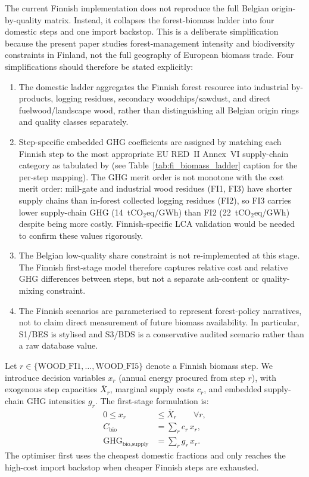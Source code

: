\documentclass{article}
\begin{document}
The current Finnish implementation does not reproduce the full Belgian origin-by-quality matrix. Instead, it collapses the forest-biomass ladder into four domestic steps and one import backstop. This is a deliberate simplification because the present paper studies forest-management intensity and biodiversity constraints in Finland, not the full geography of European biomass trade. Four simplifications should therefore be stated explicitly:
\begin{enumerate}
  \item The domestic ladder aggregates the Finnish forest resource into industrial by-products, logging residues, secondary woodchips/sawdust, and direct fuelwood/landscape wood, rather than distinguishing all Belgian origin rings and quality classes separately.
   \item Step-specific embedded GHG coefficients are assigned by matching each Finnish step to the most appropriate EU RED~II Annex~VI supply-chain category as tabulated by \citet{collaOptimalUseLignocellulosic2022} (see Table~\ref{tab:fi_biomass_ladder} caption for the per-step mapping). The GHG merit order is not monotone with the cost merit order: mill-gate and industrial wood residues (FI1, FI3) have shorter supply chains than in-forest collected logging residues (FI2), so FI3 carries lower supply-chain GHG (14~tCO$_2$eq/GWh) than FI2 (22~tCO$_2$eq/GWh) despite being more costly. Finnish-specific LCA validation would be needed to confirm these values rigorously.
 
  \item The Belgian low-quality share constraint is not re-implemented at this stage. The Finnish first-stage model therefore captures relative cost and relative GHG differences between steps, but not a separate ash-content or quality-mixing constraint.
  \item The Finnish scenarios are parameterised to represent forest-policy narratives, not to claim direct measurement of future biomass availability. In particular, S1/BES is stylised and S3/BDS is a conservative audited scenario rather than a raw database value.
\end{enumerate}

Let $r \in \{\text{WOOD\_FI1},\dots,\text{WOOD\_FI5}\}$ denote a Finnish biomass step. We introduce decision variables $x_r$ (annual energy procured from step $r$), with exogenous step capacities $\overline{X}_r$, marginal supply costs $c_r$, and embedded supply-chain GHG intensities $g_r$. The first-stage formulation is:
\begin{align}
0 \leq x_r &\leq \overline{X}_r \qquad \forall r,
\label{eq:bio_segment_cap}\\
C_{\text{bio}} &= \sum_r c_r\,x_r,
\label{eq:bio_cost}\\
\text{GHG}_{\text{bio,supply}} &= \sum_r g_r\,x_r.
\label{eq:bio_ghg}
\end{align}
The optimiser first uses the cheapest domestic fractions and only reaches the high-cost import backstop when cheaper Finnish steps are exhausted.
\end{document}
